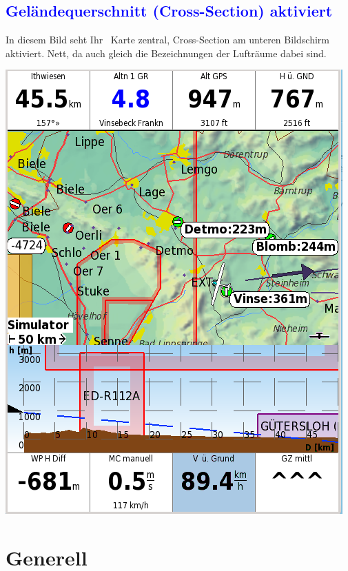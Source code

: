 \subsection*{\textcolor{blue}{Geländequerschnitt (Cross-Section) aktiviert}}
In diesem Bild seht Ihr \xc~Karte zentral, Cross-Section am unteren Bildschirm aktiviert. Nett, da auch gleich die Bezeichnungen 
der Lufträume dabei sind.
\begin{center}
 \includegraphics[angle=0,width=0.5\linewidth,keepaspectratio='true']{figures/CrossSection.png}
\end{center}
\newpage\section{Generell}\label{ch:generell}

